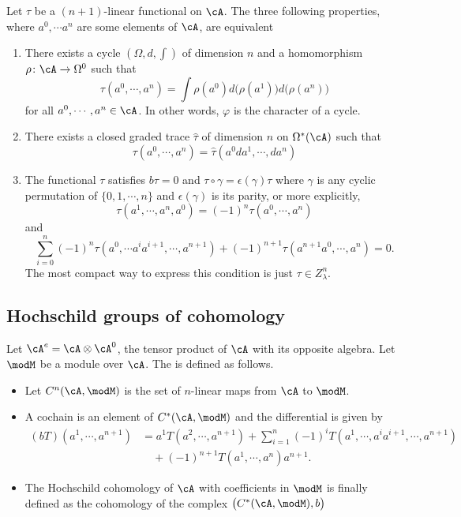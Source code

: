 \begin{proposition}
Let $\tau$ be a $(n+1)$-linear functional on $\cA$. The three following properties, where $a^0,\cdots a^n$ are some elements of $\cA$, are equivalent
\begin{enumerate}
\item There exists a cycle $(\Omega,d,\int)$ of dimension $n$ and a homomorphism $\rho\colon \cA\to \Omega^0$ such that
\[
  \tau(a^0,\cdots,a^{n})=\int \rho(a^0)d\big( \rho(a^1) \big)d\big( \rho(a^{n}) \big)
\]
for all $a^0,\cdots,a^{n}\in\cA$. In other words, $\varphi$ is the character of a cycle.
\item There exists a closed graded trace $\hat{\tau}$ of dimension $n$ on $\Omega^*(\cA)$ such that
\[
  \tau(a^0,\cdots,a^{n})=\hat{\tau}(a^0da^1,\cdots,da^{n})
\]
\item The functional $\tau$ satisfies $b\tau=0$ and $\tau\circ\gamma=\epsilon(\gamma)\tau$ where $\gamma$ is any cyclic permutation of $\{ 0,1,\cdots,n \}$ and $\epsilon(\gamma)$ is its parity, or more explicitly,
\[
	\tau(a^1,\cdots,a^{n},a^0)=(-1)^n\tau(a^0,\cdots,a^{n})
\]
and
\[
   \sum_{i=0}^{n}(-1)^n\tau(a^0,\cdots a^ia^{i+1},\cdots,a^{n+1})+(-1)^{n+1}\tau(a^{n+1}a^0,\cdots,a^{n})=0.
\]
The most compact way to express this condition is just $\tau\in Z^n_{\lambda}$.
\end{enumerate}
\end{proposition}

\subsection{Hochschild groups of cohomology}

\begin{definition}
    Let $\cA^e=\cA\otimes\cA^0$, the tensor product of $\cA$ with its opposite algebra. Let $\modM$ be a module over $\cA$. The  is defined as follows. 

    \begin{itemize}
        \item 
    Let $C^n(\cA,\modM)$ is the set of $n$-linear maps from $\cA$ to $\modM$. 
\item A cochain is an element of $C^*(\cA,\modM)$ and the differential is given by
    \begin{equation}
    \begin{split}
    (bT)(a^1,\cdots,a^{n+1})&=a^1T(a^2,\cdots,a^{n+1})+\sum_{i=1}^{n}(-1)^iT(a^1,\cdots,a^ia^{i+1},\cdots,a^{n+1})\\
                    &\quad +(-1)^{n+1}T(a^1,\cdots,a^{n})a^{n+1}.
    \end{split}
    \end{equation}
\item
    The Hochschild cohomology of $\cA$ with coefficients in $\modM$ is finally defined as the cohomology of the complex $\big( C^*(\cA,\modM),b \big)$
    \end{itemize}
\end{definition}

